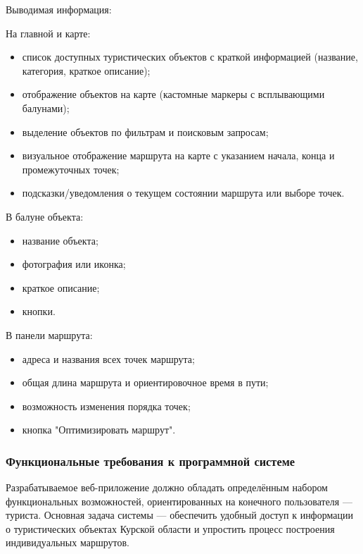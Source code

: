 Выводимая информация:

На главной и карте:
\begin{itemize}
	\item список доступных туристических объектов с краткой информацией\cite{b6} (название, категория, краткое описание);
	\item отображение объектов на карте (кастомные маркеры с всплывающими балунами);
	\item выделение объектов по фильтрам и поисковым запросам;
	\item визуальное отображение маршрута на карте с указанием начала, конца и промежуточных точек;
	\item подсказки/уведомления о текущем состоянии маршрута или выборе точек.
\end{itemize}

В балуне объекта:
\begin{itemize}
	\item название объекта;
	\item фотография или иконка;
	\item краткое описание;
	\item кнопки.
\end{itemize}

В панели маршрута:
\begin{itemize}
	\item адреса и названия всех точек маршрута;
	\item общая длина маршрута и ориентировочное время в пути;
	\item возможность изменения порядка точек;
	\item кнопка "Оптимизировать маршрут".
\end{itemize}

\subsubsection{Функциональные требования к программной системе}

Разрабатываемое веб-приложение должно обладать определённым набором функциональных возможностей, ориентированных на конечного пользователя — туриста. Основная задача системы — обеспечить удобный доступ к информации о туристических объектах Курской области и упростить процесс построения индивидуальных маршрутов\cite{b7}.

